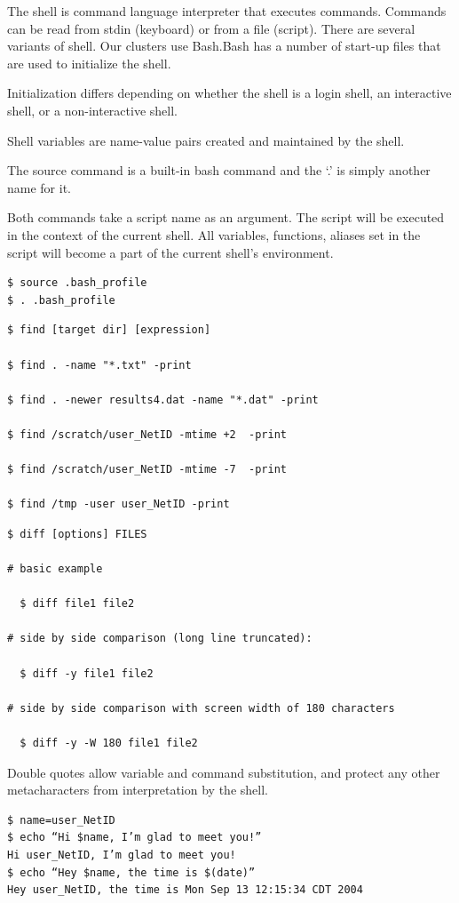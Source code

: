 The shell is command language interpreter that executes commands. Commands can be read from stdin (keyboard) or from a file (script). There are several variants of shell.  Our clusters use Bash.Bash has a number of start-up files that are used to initialize the shell.

Initialization differs depending on whether the shell is a login shell, an interactive shell, or a non-interactive shell.

Shell variables are name-value pairs created and maintained by the shell.

The source command is a built-in bash command and the ‘.’ is simply another name for it.

Both commands take a script name as an argument.  The script will be executed in the context of the current shell.  All variables, functions, aliases set in the script will become a part of the current shell’s environment.
\begin{verbatim}
$ source .bash_profile
$ . .bash_profile
\end{verbatim}


\begin{Verbatim}
$ find [target dir] [expression]

$ find . -name "*.txt" -print
 
$ find . -newer results4.dat -name "*.dat" -print
 
$ find /scratch/user_NetID -mtime +2  -print
 
$ find /scratch/user_NetID -mtime -7  -print
 
$ find /tmp -user user_NetID -print
\end{Verbatim}

\begin{verbatim}
$ diff [options] FILES
 
# basic example
 
  $ diff file1 file2
 
# side by side comparison (long line truncated):
 
  $ diff -y file1 file2
 
# side by side comparison with screen width of 180 characters
 
  $ diff -y -W 180 file1 file2

\end{verbatim}


Double quotes allow variable and command substitution, and protect any other metacharacters from interpretation by the shell.

\begin{verbatim}
$ name=user_NetID
$ echo “Hi $name, I’m glad to meet you!”
Hi user_NetID, I’m glad to meet you!
$ echo “Hey $name, the time is $(date)”
Hey user_NetID, the time is Mon Sep 13 12:15:34 CDT 2004

\end{verbatim}


